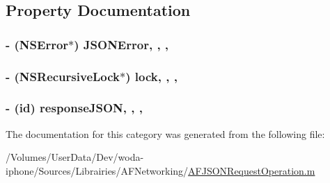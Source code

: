 \subsection{Property Documentation}
\hypertarget{category_a_f_j_s_o_n_request_operation_07_08_af84fedbcee459bee0491e551f017e9bd}{
\subsubsection[{J\-S\-O\-N\-Error}]{\setlength{\rightskip}{0pt plus 5cm}-\/ (N\-S\-Error$\ast$) J\-S\-O\-N\-Error\hspace{0.3cm}{\ttfamily [read]}, {\ttfamily [write]}, {\ttfamily [nonatomic]}, {\ttfamily [strong]}}}\label{category_a_f_j_s_o_n_request_operation_07_08_af84fedbcee459bee0491e551f017e9bd}
\hypertarget{category_a_f_j_s_o_n_request_operation_07_08_a9b544e1fd2dc7ec2d568ec09c12ec9ed}{
\subsubsection[{lock}]{\setlength{\rightskip}{0pt plus 5cm}-\/ (N\-S\-Recursive\-Lock$\ast$) lock\hspace{0.3cm}{\ttfamily [read]}, {\ttfamily [write]}, {\ttfamily [nonatomic]}, {\ttfamily [strong]}}}\label{category_a_f_j_s_o_n_request_operation_07_08_a9b544e1fd2dc7ec2d568ec09c12ec9ed}
\hypertarget{category_a_f_j_s_o_n_request_operation_07_08_a52b32f8f6a89688aed17411fe546b2ae}{
\subsubsection[{response\-J\-S\-O\-N}]{\setlength{\rightskip}{0pt plus 5cm}-\/ (id) response\-J\-S\-O\-N\hspace{0.3cm}{\ttfamily [read]}, {\ttfamily [write]}, {\ttfamily [nonatomic]}, {\ttfamily [strong]}}}\label{category_a_f_j_s_o_n_request_operation_07_08_a52b32f8f6a89688aed17411fe546b2ae}


The documentation for this category was generated from the following file\-:\begin{DoxyCompactItemize}
\item 
/\-Volumes/\-User\-Data/\-Dev/woda-\/iphone/\-Sources/\-Librairies/\-A\-F\-Networking/\hyperlink{_a_f_j_s_o_n_request_operation_8m}{A\-F\-J\-S\-O\-N\-Request\-Operation.\-m}\end{DoxyCompactItemize}
